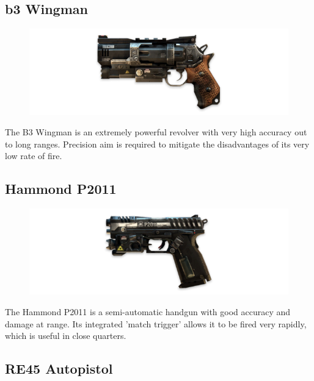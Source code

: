 \documentclass[9pt, openany]{extbook}
\begin{document}
\subsection{b3 Wingman}

\begin{figure}
\vspace*{-2em}
\includegraphics[width=\linewidth]{B3wingman}
\end{figure}

The B3 Wingman is an extremely powerful revolver with very high accuracy out to long ranges. Precision aim is required to mitigate the disadvantages of its very low rate of fire. 

\subsection{Hammond P2011}

\begin{figure}
\vspace*{-2em}
\includegraphics[width=\linewidth]{HammondP2011}
\end{figure}

The Hammond P2011 is a semi-automatic handgun with good accuracy and damage at range. Its integrated 'match trigger' allows it to be fired very rapidly, which is useful in close quarters. 

\subsection{RE45 Autopistol}
\end{document}
